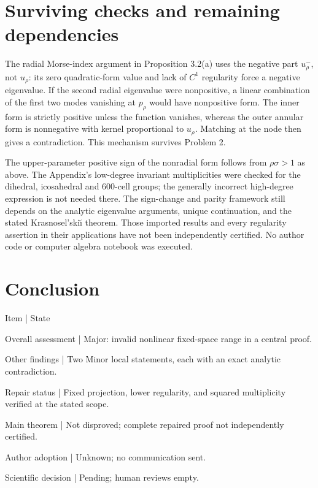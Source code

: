 \documentclass[10pt]{article}
\begin{document}
\section*{Surviving checks and remaining dependencies}
The radial Morse-index argument in Proposition 3.2(a) uses the negative part \(u_\rho^-\), not \(u_\rho\): its zero quadratic-form value and lack of \(C^1\) regularity force a negative eigenvalue. If the second radial eigenvalue were nonpositive, a linear combination of the first two modes vanishing at \(p_\rho\) would have nonpositive form. The inner form is strictly positive unless the function vanishes, whereas the outer annular form is nonnegative with kernel proportional to \(u_\rho\). Matching at the node then gives a contradiction. This mechanism survives Problem 2.\par
The upper-parameter positive sign of the nonradial form follows from \(\rho\sigma>1\) as above. The Appendix’s low-degree invariant multiplicities were checked for the dihedral, icosahedral and 600-cell groups; the generally incorrect high-degree expression is not needed there. The sign-change and parity framework still depends on the analytic eigenvalue arguments, unique continuation, and the stated Krasnosel’skiı̆ theorem. Those imported results and every regularity assertion in their applications have not been independently certified. No author code or computer algebra notebook was executed.\par
\section*{Conclusion}
Item | State\par
Overall assessment | Major: invalid nonlinear fixed-space range in a central proof.\par
Other findings | Two Minor local statements, each with an exact analytic contradiction.\par
Repair status | Fixed projection, lower regularity, and squared multiplicity verified at the stated scope.\par
Main theorem | Not disproved; complete repaired proof not independently certified.\par
Author adoption | Unknown; no communication sent.\par
Scientific decision | Pending; human reviews empty.\par
\end{document}
